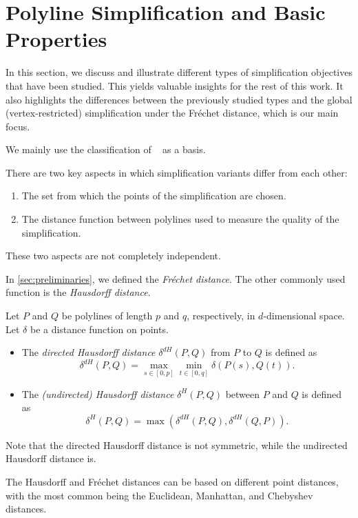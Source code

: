 \section{Polyline Simplification and Basic Properties}\label{sec:polyline-simplification}
In this section, we discuss and illustrate different types of simplification objectives that have been studied. This yields valuable insights for the rest of this work. It also highlights the differences between the previously studied types and the global (vertex-restricted) simplification under the Fréchet distance, which is our main focus.

We mainly use the classification of \citeauthor{global_curve_simplification}~\cite{global_curve_simplification} as a basis.

There are two key aspects in which simplification variants differ from each other:
\begin{enumerate}
  \item The set from which the points of the simplification are chosen.
	\item The distance function between polylines used to measure the quality of the simplification.
\end{enumerate}
These two aspects are not completely independent.

In \cref{sec:preliminaries}, we defined the \emph{Fréchet distance}. The other commonly used function is the \emph{Hausdorff distance}.

\begin{definition}
  Let \(P\) and \(Q\) be polylines of length \(p\) and \(q\), respectively, in \(d\)-dimensional space. Let \(\delta\) be a distance function on points.
	\begin{itemize}
		\item The \emph{directed Hausdorff distance} \(\delta^{dH}(P, Q)\) from \(P\) to \(Q\) is defined as
		\[\delta^{dH}(P, Q) = \max_{s \in [0, p]}\min_{t \in [0, q]} \delta(P(s), Q(t)).\]
		\item The \emph{(undirected) Hausdorff distance} \(\delta^{H}(P, Q)\) between \(P\) and \(Q\) is defined as
		\[\delta^{H}(P, Q) = \max(\delta^{dH}(P, Q), \delta^{dH}(Q, P)).\]
	\end{itemize}
	Note that the directed Hausdorff distance is not symmetric, while the undirected Hausdorff distance is.
\end{definition}

The Hausdorff and Fréchet distances can be based on different point distances, with the most common being the Euclidean, Manhattan, and Chebyshev distances.

